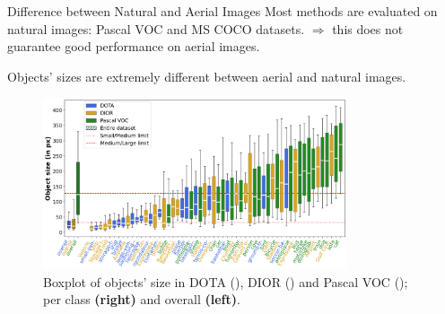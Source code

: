 \begin{subsectionframemod}{Difference between Natural and Aerial Images}
    Most methods are evaluated on natural images: Pascal VOC and MS COCO datasets. 
    $\Rightarrow$ this does not guarantee good performance on aerial images. 
    \vspace{2mm}

    Objects' sizes are extremely different between aerial and natural images.  

    \begin{figure}
        \includegraphics[width=0.8\textwidth]{Figures/object_sizes.png}
        \caption{Boxplot of objects' size in DOTA (\cite{xia2018dota}), DIOR (\cite{li2020object}) and Pascal VOC (\cite{everingham2010pascal}); per class \textbf{(right)} and overall \textbf{(left)}.}
    \end{figure}

    

    
\end{subsectionframemod}